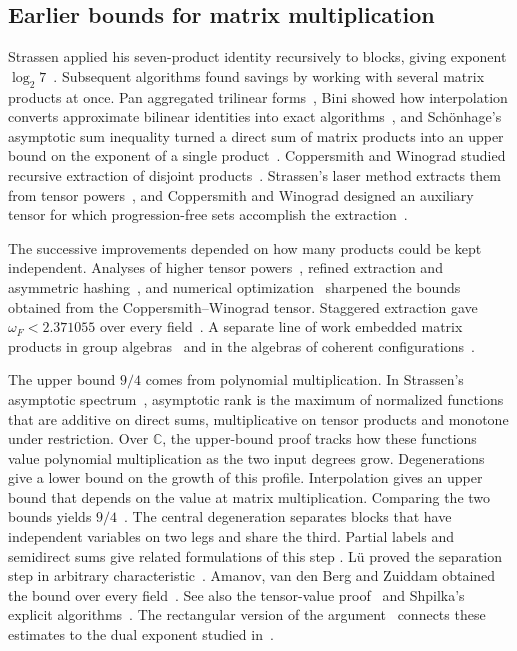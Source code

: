 \subsection{Earlier bounds for matrix multiplication}\label{sec:history}

Strassen applied his seven-product identity recursively to blocks, giving
exponent $\log_2 7$~\cite{strassen}. Subsequent algorithms found savings
by working with several matrix products at once. Pan aggregated trilinear
forms~\cite{pan}, Bini showed how interpolation converts approximate
bilinear identities into exact algorithms~\cite{bini}, and Sch\"onhage's
asymptotic sum inequality turned a direct sum of matrix products into an
upper bound on the exponent of a single product~\cite{schoenhage}.
Coppersmith and Winograd studied recursive extraction of disjoint
products~\cite{cw82}. Strassen's laser method extracts them from tensor
powers~\cite{Strassen87}, and Coppersmith and Winograd designed an auxiliary
tensor for which progression-free sets accomplish the extraction~\cite{cw}.

The successive improvements depended on how many products could be kept
independent. Analyses of higher tensor powers~\cite{sto,ds,vw,legall},
refined extraction and asymmetric hashing~\cite{avw,duan,alphaomega,alman},
and numerical optimization~\cite{dupont} sharpened the bounds obtained
from the Coppersmith--Winograd tensor. Staggered extraction gave
$\omega_F<2.371055$ over every field~\cite{stagger}. A separate line of
work embedded matrix products in group algebras~\cite{cohn2003,cohn2005}
and in the algebras of coherent configurations~\cite{CohnUmansSupport}.

The upper bound $9/4$ comes from polynomial multiplication. In Strassen's
asymptotic spectrum~\cite{spectrum}, asymptotic rank is the maximum of
normalized functions that are additive on direct sums, multiplicative on
tensor products and monotone under restriction. Over $\mathbb C$, the
upper-bound proof tracks how these functions value polynomial multiplication
as the two input degrees grow. Degenerations give a lower bound on the
growth of this profile. Interpolation gives an upper bound that depends on
the value at matrix multiplication. Comparing the two bounds yields
$9/4$~\cite[Theorem~1.1]{nine}. The central degeneration separates blocks
that have independent variables on two legs and share the third. Partial
labels and semidirect sums give related formulations of this step
\cite{two258,li}. L\"u proved the separation step in arbitrary
characteristic~\cite{lu}. Amanov, van den Berg and Zuiddam obtained the
bound over every field~\cite[Theorem~1.1]{abvz}. See also the tensor-value
proof~\cite{tensorvalue} and Shpilka's explicit algorithms~\cite{shpilka}.
The rectangular version of the argument~\cite{uznanski,abvz} connects
these estimates to the dual exponent studied in~\cite{coppersmith,alphaomega}.

